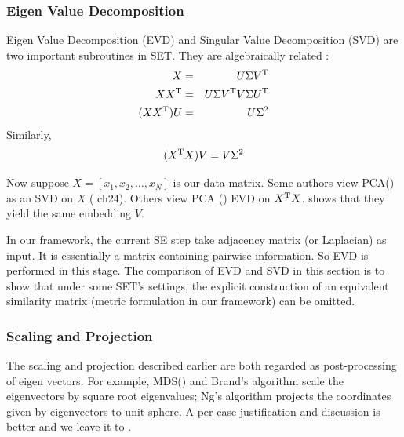 \subsubsection{Eigen Value Decomposition}

Eigen Value Decomposition (EVD) and Singular Value Decomposition (SVD)
are two important subroutines in SET. They are algebraically related
\cite{wiki_svd}:
\begin{eqnarray}
	X &=& U \Sigma V^\mathrm{T} \\
	XX^\mathrm{T} &=& U \Sigma V^\mathrm{T} V \Sigma U^\mathrm{T} \\
	(XX^\mathrm{T}) U &=& U \Sigma^2 
\end{eqnarray}
Similarly, 
\begin{equation}
	(X^\mathrm{T}X) V = V \Sigma^2 
	\label{eq:svd_evd_rel}
\end{equation}

Now suppose $ X = [x_1, x_2, \ldots, x_N] $ is our data matrix. 
Some authors view PCA(\rsec{\ref{sec:pca}}) 
as an SVD on $ X $ (\cite{borg2005modern} ch24). 
Others view PCA (\rsec{\ref{sec:pca}}) EVD on $ X^\mathrm{T}X $. 
\req{\ref{eq:svd_evd_rel}} shows that they yield the 
same embedding $ V $. 

In our framework, the current SE step take adjacency matrix
(or Laplacian) as input. It is essentially a matrix containing 
pairwise information. So EVD is performed in this stage. 
The comparison of EVD and SVD in this section is to show that 
under some SET's settings, the explicit construction of an 
equivalent similarity matrix (metric formulation in our framework)
can be omitted. 

\subsubsection{Scaling and Projection}
\label{sec:postproc}

The scaling and projection described earlier are 
both regarded as post-processing of eigen vectors. 
For example, MDS(\rsec{\ref{sec:mds}}) and Brand's algorithm
\cite{brand2003unifying} scale the eigenvectors by square root
eigenvalues; Ng's algorithm \cite{ng2002spectral} projects 
the coordinates given by eigenvectors to unit sphere. 
A per case justification and discussion is better and 
we leave it to \rsec{\ref{sec:justification}}. 

